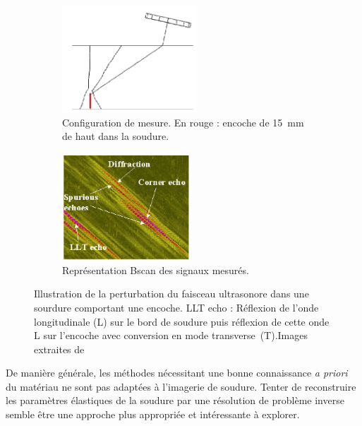 \begin{figure}[!h]
    \centering
    \begin{subfigure}[c]{0.3\textwidth}
    	\centering
        \includegraphics[height=4cm]{img/chassignole_echos_config.png}
        \caption{ Configuration de mesure. En rouge : encoche de 15~mm de haut dans la soudure.}
    \end{subfigure}
    \hspace{1cm}
    \begin{subfigure}[c]{0.3\textwidth}
    	\centering
        \includegraphics[height=4cm]{img/chassignole_echos.png}
        \caption{Représentation Bscan des signaux mesurés.}
    \end{subfigure}
    \caption{Illustration de la perturbation du faisceau ultrasonore dans une sourdure comportant une encoche.  LLT echo : Réflexion de l'onde longitudinale (L) sur le bord de soudure puis réflexion de cette onde L sur l'encoche avec conversion en mode transverse~(T).Images extraites de \cite{chassignole_beam}  }\label{echos}
\end{figure}

De manière générale, les méthodes nécessitant une bonne connaissance \emph{a priori} du matériau ne sont pas adaptées à l'imagerie de soudure. Tenter de reconstruire les paramètres élastiques de la soudure par une résolution de problème inverse semble être une approche plus appropriée et intéressante à explorer.






